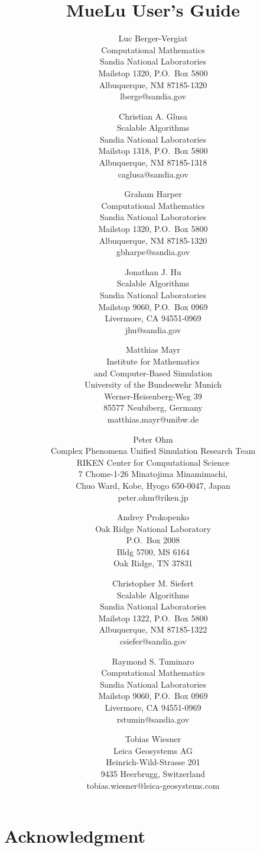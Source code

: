 \documentclass[pdf,12pt,report]{SANDreport}
\title{MueLu User's Guide}
\author{
  Luc Berger-Vergiat\\
  Computational Mathematics\\
  Sandia National Laboratories\\
  Mailstop 1320, P.O.~Box 5800 \\
  Albuquerque, NM 87185-1320\\
  lberge@sandia.gov
  \and
  Christian A. Glusa \\
  Scalable Algorithms\\
  Sandia National Laboratories\\
  Mailstop 1318, P.O.~Box 5800 \\
  Albuquerque, NM 87185-1318\\
  caglusa@sandia.gov
  \and
  Graham Harper\\
  Computational Mathematics\\
  Sandia National Laboratories\\
  Mailstop 1320, P.O.~Box 5800 \\
  Albuquerque, NM 87185-1320\\
  gbharpe@sandia.gov
  \and
  Jonathan J. Hu \\
  Scalable Algorithms \\
  Sandia National Laboratories\\
  Mailstop 9060, P.O.~Box 0969 \\
  Livermore, CA 94551-0969\\
  jhu@sandia.gov
  \and
  Matthias Mayr \\
  Institute for Mathematics \\
  and Computer-Based Simulation\\
  University of the Bundeswehr Munich\\
  Werner-Heisenberg-Weg 39\\
  85577 Neubiberg, Germany\\
  matthias.mayr@unibw.de
  \and
  Peter Ohm\\
  Complex Phenomena Unified Simulation Research Team \\
  RIKEN Center for Computational Science \\
  7 Chome-1-26 Minatojima Minamimachi, \\
  Chuo Ward, Kobe, Hyogo 650-0047, Japan \\
  peter.ohm@riken.jp
  \and
  Andrey Prokopenko \\
  Oak Ridge National Laboratory\\
  P.O.~Box 2008\\
  Bldg 5700, MS 6164\\
  Oak Ridge, TN 37831\\
  \and
  Christopher M. Siefert\\
  Scalable Algorithms\\
  Sandia National Laboratories\\
  Mailstop 1322, P.O.~Box 5800 \\
  Albuquerque, NM 87185-1322\\
  csiefer@sandia.gov
  \and
  Raymond S. Tuminaro\\
  Computational Mathematics\\
  Sandia National Laboratories\\
  Mailstop 9060, P.O.~Box 0969 \\
  Livermore, CA 94551-0969\\
  rstumin@sandia.gov
  \and
  Tobias Wiesner \\
  Leica Geosystems AG\\
  Heinrich-Wild-Strasse 201\\
  9435 Heerbrugg, Switzerland\\
  tobias.wiesner@leica-geosystems.com
}
\date{}
\begin{document}
    \maketitle

    \begin{abstract}
	
    \end{abstract}


    \clearpage
    \chapter*{Acknowledgment}
	


    \cleardoublepage		%
    \tableofcontents
    \listoffigures
    \listoftables




\end{document}
